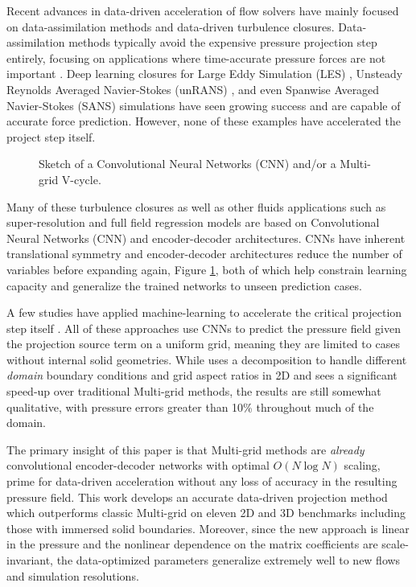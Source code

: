\documentclass[review]{elsarticle}
\begin{document}
Recent advances in data-driven acceleration of flow solvers have mainly focused on data-assimilation methods and data-driven turbulence closures. Data-assimilation methods typically avoid the expensive pressure projection step entirely, focusing on applications where time-accurate pressure forces are not important \cite{asch2016data}. Deep learning closures for Large Eddy Simulation (LES) \cite{BECK2019108910,maulik_san_rasheed_vedula_2019}, Unsteady Reynolds Averaged Navier-Stokes (unRANS) \cite{ling_kurzawski_templeton_2016}, and even Spanwise Averaged Navier-Stokes (SANS) \cite{font2021deep} simulations have seen growing success and are capable of accurate force prediction. However, none of these examples have accelerated the project step itself.

\begin{figure}
    \caption{Sketch of a Convolutional Neural Networks (CNN) and/or a Multi-grid V-cycle.}
    \label{fig:multigrid}
\end{figure}

Many of these turbulence closures as well as other fluids applications such as super-resolution \cite{ferdian20204dflownet,liu2020deep} and full field regression models \cite{duru2021cnnfoil,bhatnagar2019prediction} are based on Convolutional Neural Networks (CNN) and encoder-decoder architectures. CNNs have inherent translational symmetry and encoder-decoder architectures reduce the number of variables before expanding again, Figure \ref{fig:multigrid}, both of which help constrain learning capacity and generalize the trained networks to unseen prediction cases. 

A few studies have applied machine-learning to accelerate the critical projection step itself \cite{ozbay2021poisson,Xiao2020,ajuria2020}. All of these approaches use CNNs to predict the pressure field given the projection source term on a uniform grid, meaning they are limited to cases without internal solid geometries. While \cite{ozbay2021poisson} uses a decomposition to handle different \textit{domain} boundary conditions and grid aspect ratios in 2D and sees a significant speed-up over traditional Multi-grid methods, the results are still somewhat qualitative, with pressure errors greater than 10\% throughout much of the domain.

The primary insight of this paper is that Multi-grid methods are \textit{already} convolutional encoder-decoder networks with optimal $O(N\log N)$ scaling, prime for data-driven acceleration without any loss of accuracy in the resulting pressure field. This work develops an accurate data-driven projection method which outperforms classic Multi-grid on eleven 2D and 3D benchmarks including those with immersed solid boundaries. Moreover, since the new approach is linear in the pressure and the nonlinear dependence on the matrix coefficients are scale-invariant, the data-optimized parameters generalize extremely well to new flows and simulation resolutions.
\end{document}
